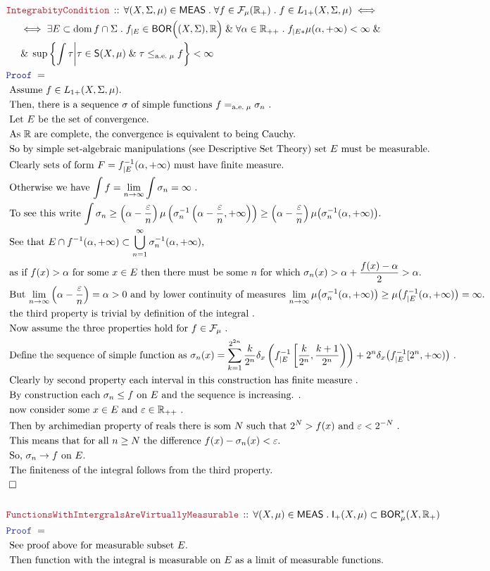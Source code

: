 \documentclass[12pt]{scrartcl}
\newcommand{\LOGIC}[1]{\textcolor{Blue}{\mathtt{#1}}}
\newcommand{\THM}[1]{\textcolor{Maroon}{\mathtt{#1}}}
\renewcommand{\.}{\; . \;}
\newcommand{\Theorem}[2]{& \THM{#1} \, :: \, #2 \\ & \Proof = \\ }
\newcommand{\NewLine}{\\ & \kern 1pc}
\newcommand{\Page}[1]{ \begin{align*} #1 \end{align*}   }
\renewcommand{\And}{\; \& \;}
\newcommand{\Reals}{\mathbb{R} }
\newcommand{\QED}{\; \square}
\newcommand{\EndProof}{& \QED \\}
\newcommand{\Proof}{\LOGIC{Proof} \; }
\newcommand{\Explain}[1]{& \text{#1.} \\}
\newcommand{\ExplainFurther}[1]{& \text{#1} \\}
\DeclareMathOperator*{\dom}{dom}
\newcommand{\BOR}{\mathsf{BOR}}
\renewcommand{\ae}{\mathrm{a.e.}}
\newcommand{\Integrable}{\mathsf{I}}
\newcommand{\F}{\mathcal{F}}
\newcommand{\MEAS}{\mathsf{MEAS}}
\newcommand{\Simple}{\mathsf{S}}
\begin{document}
\Page{
	\Theorem
	{
		IntegrabityCondition	
	}
	{
		\forall (X,\Sigma,\mu) \in \MEAS \.
		\forall f \in \F_\mu(\Reals_+) \.
		f \in L_{1+}(X,\Sigma,\mu) \iff \NewLine \iff
		\exists E \subset \dom f \cap \Sigma \. 
		f_{|E} \in \BOR\Big((X,\Sigma),\Reals\Big)
		\And 
		\forall \alpha \in \Reals_{++} \. f_{|E*}\mu(\alpha,+\infty) < \infty
		\And \NewLine \And
		 \sup \left\{  \int \tau  \bigg| \tau \in \Simple(X,\mu) \And \tau \le_{\ae \; \mu} f \right\} < \infty
	}
	\Explain{ 
		Assume $f \in L_{1+}(X,\Sigma,\mu)$}
	\Explain{
		Then, there is a sequence $\sigma$ of simple functions $f =_{\ae\;\mu} \sigma_{n}$
	}
	\Explain{ 
		Let $E$ be the set of convergence}
	\Explain{
		As $\Reals$ are complete, the convergence is equivalent to being Cauchy}
	\Explain{ 
		So by simple set-algebraic manipulations (see Descriptive Set Theory) set $E$
		must be measurable}
	\Explain{
		Clearly sets of form $F = f^{-1}_{|E}(\alpha,+\infty)$ must have finite measure}
	\Explain{ 
		Otherwise we have $\int f = \lim_{ n \to \infty} \int \sigma_n = \infty$
	}
	\Explain{
		To see this write
		$
			\int \sigma_n \ge   
			\left(\alpha - \frac{\varepsilon}{n} \right)
			\mu\left(\sigma^{-1}_{n}\left(\alpha - \frac{\varepsilon}{n},+\infty\right)\right)
			\ge 
			\left(\alpha - \frac{\varepsilon}{n} \right)
			\mu\big(  \sigma^{-1}_{n} (\alpha,+\infty)\big)
		$}
	\ExplainFurther{ See that $E \cap  f^{-1} (\alpha,+\infty) 
		\subset \bigcup^\infty_{n=1}  \sigma_n^{-1} (\alpha,+\infty) $,}
	\Explain{ 
		as if $f(x) > \alpha$ for some $x \in E$ then there must be some $n$ for which  
		$\sigma_n(x) > \alpha + \frac{f(x)-\alpha}{2} > \alpha$}
	\Explain{
		But $\lim_{n \to \infty} \left(\alpha - \frac{\varepsilon}{n}\right) = \alpha > 0$
		and by lower continuity of measures
		$
			\lim_{n \to \infty}
			\mu\big(  \sigma^{-1}_{n} (\alpha,+\infty)\big) \ge
			\mu\big(   f_{|E}^{-1} (\alpha,+\infty) \big) = \infty
		$}
	\Explain{ the third property is trivial by definition of the integral }
	\Explain{ Now assume the three properties hold for $f \in \F_\mu$ }
	\Explain{  Define the sequence of simple function as 
		$
		\sigma_n(x) = \sum^{2^{2n}}_{k=1} \frac{k}{2^n}\delta_x
		\left( f^{-1}_{|E}\left[\frac{k}{2^n},\frac{k+1}{2^n}\right)\right)
		+ 2^n \delta_x\big( f^{-1}_{|E}[2^n, + \infty )\big)		
		$
	}
	\Explain{
		Clearly by second property each interval in this construction has finite measure
	}
	\Explain{ 
		By construction each $\sigma_n \le f$ on $E$ and the sequence is increasing. 
	}
	\Explain{ now consider some $x \in E$ and $\varepsilon \in \Reals_{++}$
	}
	\Explain{
		Then by archimedian property of reals there is som $N$ such that $2^N > f(x)$
		and $\varepsilon <  2^{-N}$
	}
	\Explain{
		This means that for all $n \ge N$ the difference $ f(x) - \sigma_n(x) < \varepsilon$}
	\Explain{ So, $\sigma_n \to f$ on $E$}
	\Explain{ The finiteness of the integral follows from the third property}
	\EndProof 
	\\
	\Theorem{FunctionsWithIntergralsAreVirtuallyMeasurable}
	{
		\forall (X,\mu) \in \MEAS \.
		\Integrable_+(X,\mu) \subset \BOR^*_\mu(X,\Reals_+)
	}
	\Explain{
		See proof above for measurable subset $E$}
	\Explain{
		Then function with the integral is measurable on $E$ as a limit of measurable functions}
}
\newpage
\end{document}
